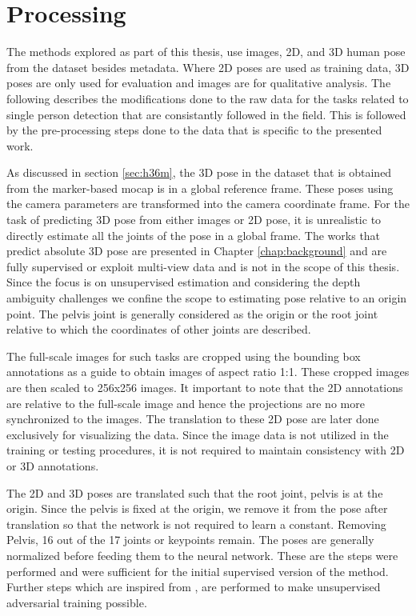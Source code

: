 \section{Processing}
\label{processing}
The methods explored as part of this thesis, use images, 2D, and 3D human pose from the dataset besides metadata. Where 2D poses are used as training data, 3D poses are only used for evaluation and images are for qualitative analysis. The following describes the modifications done to the raw data for the tasks related to single person detection that are consistantly followed in the field. This is followed by the pre-processing steps done to the data that is specific to the presented work.

As discussed in section \ref{sec:h36m}, the 3D pose in the dataset that is obtained from the marker-based \ac{mocap} is in a global reference frame. These poses using the camera parameters are transformed into the camera coordinate frame. For the task of predicting 3D pose from either images or 2D pose, it is unrealistic to directly estimate all the joints of the pose in a global frame. The works that predict absolute 3D pose are presented in Chapter \ref{chap:background} and are fully supervised or exploit multi-view data and is not in the scope of this thesis. Since the focus is on unsupervised estimation and considering the depth ambiguity challenges we confine the scope to estimating pose relative to an origin point. The pelvis joint is generally considered as the origin or the root joint relative to which the coordinates of other joints are described. 

The full-scale images for such tasks are cropped using the bounding box annotations as a guide to obtain images of aspect ratio 1:1. These cropped images are then scaled to 256x256 images. It important to note that the 2D annotations are relative to the full-scale image and hence the projections are no more synchronized to the images. The translation to these 2D pose are later done exclusively for visualizing the data. Since the image data is not utilized in the training or testing procedures, it is not required to maintain consistency with 2D or 3D annotations. 

The 2D and 3D poses are translated such that the root joint, pelvis is at the origin. Since the pelvis is fixed at the origin, we remove it from the pose after translation so that the network is not required to learn a constant. Removing Pelvis, 16 out of the 17 joints or keypoints remain. The poses are generally normalized before feeding them to the neural network. These are the steps were performed and were sufficient for the initial supervised version of the method. Further steps which are inspired from \cite{amazon1}, are performed to make unsupervised adversarial training possible. 

